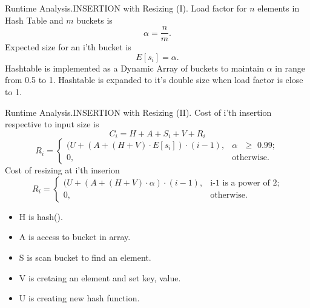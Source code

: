 \documentclass{beamer}
\begin{document}
\begin{frame}{Runtime Analysis.}{INSERTION with Resizing (I).}
  Load factor for $n$ elements in Hash Table and $m$ buckets is
  \begin{equation} \alpha = \frac{n}{m}.\end{equation}
  Expected size for an i'th bucket is
  \begin{equation} E[s_i] = \alpha. \end{equation}
  Hashtable is implemented as a Dynamic Array of buckets to maintain $\alpha$ in range from 0.5 to 1.
  Hashtable is expanded to it's double size when load factor is close to 1.
\end{frame}

\begin{frame}{Runtime Analysis.}{INSERTION with Resizing (II).}
  Cost of i'th insertion respective to input size is
  \begin{equation}
    C_i = H + A + S_i + V + R_i 
  \end{equation}
  \begin{equation}
    R_i = \begin{cases} (U + (A+(H+V)\cdot E[s_i])\cdot(i - 1), &\text{$\alpha$ $\geq$ 0.99}; \\
    0, & \text{otherwise}.
    \end{cases}
  \end{equation}
  Cost of resizing at i'th inserion  
  \begin{equation}
    R_i = \begin{cases} (U + (A+(H+V)\cdot\alpha)\cdot(i - 1), &\text{i-1 is a power of 2}; \\
    0, & \text{otherwise}.
    \end{cases}
  \end{equation}
  \begin{itemize}
  \item H is hash().
  \item A is access to bucket in array.
  \item S is scan bucket to find an element.
  \item V is cretaing an element and set key, value.
  \item U is creating new hash function.
  \end{itemize}
\end{frame}
\end{document}
